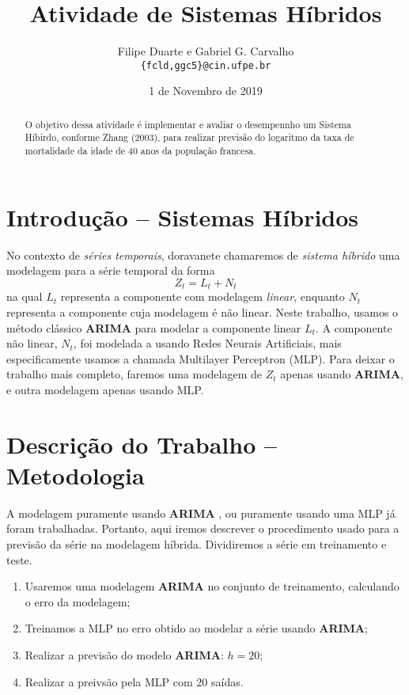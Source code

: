 \documentclass{article}
\title{Atividade de Sistemas Híbridos}
\author{Filipe Duarte e Gabriel G. Carvalho \\ \texttt{\{fcld,ggc5\}@cin.ufpe.br}}
\date{1 de Novembro de 2019}
\begin{document}
\maketitle
\begin{abstract}
O objetivo dessa atividade é implementar e avaliar o desempennho um Sistema Híbirdo, conforme Zhang (2003), para realizar previsão do logaritmo da taxa de mortalidade da idade de 40 anos da população francesa.

\end{abstract}
\maketitle

\section{Introdução -- Sistemas Híbridos}
No contexto de {\it séries temporais}, doravanete chamaremos de {\it sistema híbrido} uma modelagem para a série temporal da forma 
\begin{equation}\label{hybriddef}
    Z_t = L_t + N_t
\end{equation}
na qual $L_t$ representa a componente com modelagem {\it linear}, enquanto $N_t$ representa a componente cuja modelagem é não linear.
Neste trabalho, usamos o método clássico {\bf ARIMA} para modelar a componente linear $L_t$. A componente não linear, $N_t$, foi modelada a usando Redes Neurais Artificiais, mais especificamente usamos a chamada Multilayer Perceptron (MLP). Para deixar o trabalho mais completo, faremos uma modelagem de $Z_t$ apenas usando {\bf ARIMA}, e outra modelagem apenas usando MLP.

\section{Descrição do Trabalho -- Metodologia}
A modelagem puramente usando {\bf ARIMA} , ou puramente usando uma MLP já foram trabalhadas. Portanto, aqui iremos descrever o procedimento usado para a previsão da série na modelagem híbrida. Dividiremos a série em treinamento e teste. 
\begin{enumerate}
    \item Usaremos uma modelagem {\bf ARIMA} no conjunto de treinamento, calculando o erro da modelagem;
    \item Treinamos a MLP no erro obtido ao modelar a série usando {\bf ARIMA};
    \item Realizar a previsão do modelo {\bf ARIMA}: $h=20$;
    \item Realizar a preivsão pela MLP com $20$ saídas.
\end{enumerate}
\end{document}
